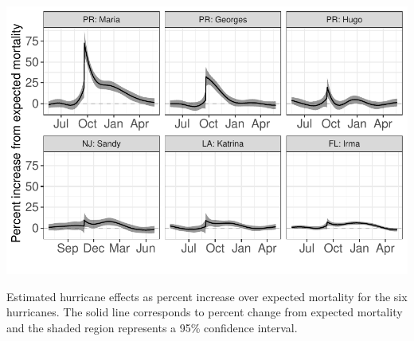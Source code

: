 \documentclass[11pt]{article}
\begin{document}
\begin{suppfigure}[ht]
	\centering
	\includegraphics[width=1\linewidth]{figs/supp-figure-2.pdf} 
    \caption{Estimated hurricane effects as percent increase over expected mortality for the six hurricanes. The solid line corresponds to percent change from expected mortality and the shaded region represents a 95\% confidence interval.}
	\label{supp-fig:hurricane-effects}
\end{suppfigure}
\end{document}
